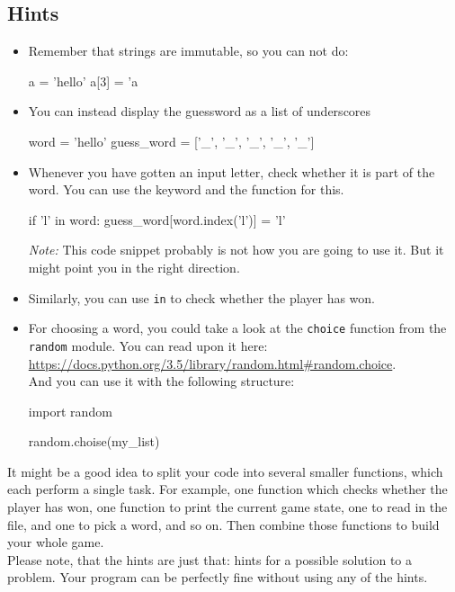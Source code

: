 \subsection*{Hints}
\begin{itemize}
  \item Remember that strings are immutable, so you can not do:
\begin{python}
a = 'hello'
a[3] = 'a
\end{python}
  \item You can instead display the guessword as a list of underscores
\begin{python}
word = 'hello'
guess_word = ['_', '_', '_', '_', '_']
\end{python}
  \item Whenever you have gotten an input letter, check whether it is
  part of the word. You can use the  keyword and the
   function for this.
\begin{python}
if 'l' in word:
  guess_word[word.index('l')] = 'l'
\end{python}
\emph{Note:} This code snippet probably is not how you are going to
use it. But it might point you in the right direction.
  \item Similarly, you can use \texttt{in} to check whether the player
  has won.
  \item For choosing a word, you could take a look at the \texttt{choice}
  function from the \texttt{random} module. You can read upon it here:
  \url{https://docs.python.org/3.5/library/random.html#random.choice}.\\
  And you can use it with the following structure:
\begin{python}
import random


random.choise(my_list)
\end{python}
\end{itemize}
It might be a good idea to split your code into several smaller functions,
which each perform a single task. For example, one function which checks
whether the player has won, one function to print the current game state,
one to read in the file, and one to pick a word, and so on. Then combine
those functions to build your whole game.\\
Please note, that the hints are just that: hints for a possible solution
to a problem. Your program can be perfectly fine without using any of
the hints.


